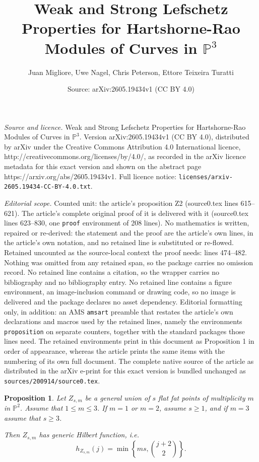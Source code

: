 \documentclass[10pt,a4paper]{amsart}
\title{Weak and Strong Lefschetz Properties for Hartshorne-Rao Modules of Curves in $\mathbb P^3$}
\author{Juan Migliore, Uwe Nagel, Chris Peterson, Ettore Teixeira Turatti}
\date{Source: arXiv:2605.19434v1 (CC BY 4.0)}
\newtheorem{proposition}{Proposition}
\begin{document}
\maketitle

\noindent\emph{Source and licence.} Weak and Strong Lefschetz Properties for Hartshorne-Rao Modules of Curves in $\mathbb P^3$. Version arXiv:2605.19434v1 (CC BY 4.0), distributed by arXiv under the Creative Commons Attribution 4.0 International licence, http://creativecommons.org/licenses/by/4.0/, as recorded in the arXiv licence metadata for this exact version and shown on the abstract page https://arxiv.org/abs/2605.19434v1. Full licence notice: \texttt{licenses/arxiv-2605.19434-CC-BY-4.0.txt}.\par\smallskip

\noindent\textit{Editorial scope.} Counted unit: the article's proposition Z2 (source0.tex lines 615--621). The article's complete original proof of it is delivered with it (source0.tex lines 623--830, one \texttt{proof} environment of 208 lines). No mathematics is written, repaired or re-derived: the statement and the proof are the article's own lines, in the article's own notation, and no retained line is substituted or re-flowed.  Retained uncounted as the source-local context the proof needs: lines 474--482.  Nothing was omitted from any retained span, so the package carries no omission record.  No retained line contains a citation, so the wrapper carries no bibliography and no bibliography entry.  No retained line contains a figure environment, an image-inclusion command or drawing code, so no image is delivered and the package declares no asset dependency.  Editorial formatting only, in addition: an AMS \texttt{amsart} preamble that restates the article's own declarations and macros used by the retained lines, namely the environments \texttt{proposition} on separate counters, together with the standard packages those lines need.  The retained environments print in this document as Proposition 1 in order of appearance, whereas the article prints the same items with the numbering of its own full document.  The complete native source of the article as distributed in the arXiv e-print for this exact version is bundled unchanged as \texttt{sources/200914/source0.tex}.
\begin{proposition} \label{GenFlatFat}
    Let $Z_{s,m}$ be a general union of $s$ flat fat points of multiplicity $m$ in $\mathbb P^2$. Assume that $1 \leq m \leq 3$. If $m = 1$ or $m=2$, assume $s \geq 1$, and if $m = 3$ assume that $s \geq 3$. 
    
    Then $Z_{s,m}$ has generic Hilbert function, i.e.
    \[    
    h_{Z_{s,m}}(j) = \min \left \{ ms, \binom{j+2}{2} \right \}.
    \]

\end{proposition}
\end{document}
